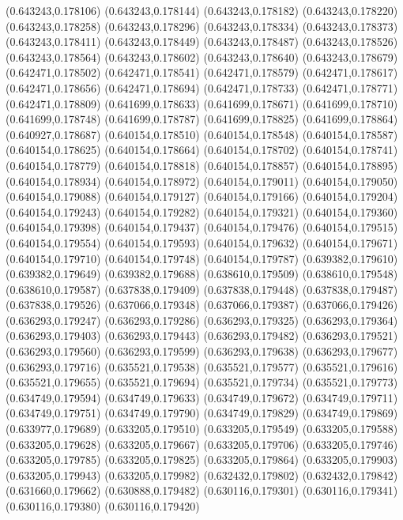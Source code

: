 (0.643243,0.178106)
(0.643243,0.178144)
(0.643243,0.178182)
(0.643243,0.178220)
(0.643243,0.178258)
(0.643243,0.178296)
(0.643243,0.178334)
(0.643243,0.178373)
(0.643243,0.178411)
(0.643243,0.178449)
(0.643243,0.178487)
(0.643243,0.178526)
(0.643243,0.178564)
(0.643243,0.178602)
(0.643243,0.178640)
(0.643243,0.178679)
(0.642471,0.178502)
(0.642471,0.178541)
(0.642471,0.178579)
(0.642471,0.178617)
(0.642471,0.178656)
(0.642471,0.178694)
(0.642471,0.178733)
(0.642471,0.178771)
(0.642471,0.178809)
(0.641699,0.178633)
(0.641699,0.178671)
(0.641699,0.178710)
(0.641699,0.178748)
(0.641699,0.178787)
(0.641699,0.178825)
(0.641699,0.178864)
(0.640927,0.178687)
(0.640154,0.178510)
(0.640154,0.178548)
(0.640154,0.178587)
(0.640154,0.178625)
(0.640154,0.178664)
(0.640154,0.178702)
(0.640154,0.178741)
(0.640154,0.178779)
(0.640154,0.178818)
(0.640154,0.178857)
(0.640154,0.178895)
(0.640154,0.178934)
(0.640154,0.178972)
(0.640154,0.179011)
(0.640154,0.179050)
(0.640154,0.179088)
(0.640154,0.179127)
(0.640154,0.179166)
(0.640154,0.179204)
(0.640154,0.179243)
(0.640154,0.179282)
(0.640154,0.179321)
(0.640154,0.179360)
(0.640154,0.179398)
(0.640154,0.179437)
(0.640154,0.179476)
(0.640154,0.179515)
(0.640154,0.179554)
(0.640154,0.179593)
(0.640154,0.179632)
(0.640154,0.179671)
(0.640154,0.179710)
(0.640154,0.179748)
(0.640154,0.179787)
(0.639382,0.179610)
(0.639382,0.179649)
(0.639382,0.179688)
(0.638610,0.179509)
(0.638610,0.179548)
(0.638610,0.179587)
(0.637838,0.179409)
(0.637838,0.179448)
(0.637838,0.179487)
(0.637838,0.179526)
(0.637066,0.179348)
(0.637066,0.179387)
(0.637066,0.179426)
(0.636293,0.179247)
(0.636293,0.179286)
(0.636293,0.179325)
(0.636293,0.179364)
(0.636293,0.179403)
(0.636293,0.179443)
(0.636293,0.179482)
(0.636293,0.179521)
(0.636293,0.179560)
(0.636293,0.179599)
(0.636293,0.179638)
(0.636293,0.179677)
(0.636293,0.179716)
(0.635521,0.179538)
(0.635521,0.179577)
(0.635521,0.179616)
(0.635521,0.179655)
(0.635521,0.179694)
(0.635521,0.179734)
(0.635521,0.179773)
(0.634749,0.179594)
(0.634749,0.179633)
(0.634749,0.179672)
(0.634749,0.179711)
(0.634749,0.179751)
(0.634749,0.179790)
(0.634749,0.179829)
(0.634749,0.179869)
(0.633977,0.179689)
(0.633205,0.179510)
(0.633205,0.179549)
(0.633205,0.179588)
(0.633205,0.179628)
(0.633205,0.179667)
(0.633205,0.179706)
(0.633205,0.179746)
(0.633205,0.179785)
(0.633205,0.179825)
(0.633205,0.179864)
(0.633205,0.179903)
(0.633205,0.179943)
(0.633205,0.179982)
(0.632432,0.179802)
(0.632432,0.179842)
(0.631660,0.179662)
(0.630888,0.179482)
(0.630116,0.179301)
(0.630116,0.179341)
(0.630116,0.179380)
(0.630116,0.179420)
